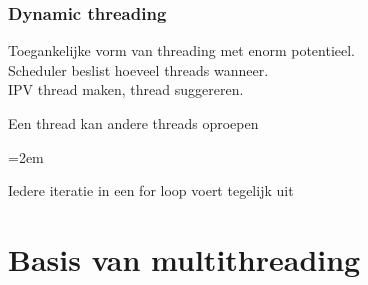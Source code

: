 \documentclass
   [kulak] %
   {kulakbeamer}
\begin{document}
\begin{frame}
	\frametitle{Dynamic threading}
	
	Toegankelijke vorm van threading met enorm potentieel.\\
	Scheduler beslist hoeveel threads wanneer.\\ IPV thread maken, thread suggereren.
	
	 
	
	\begin{description}[align=parleft]
		
		\item[\textbf{Nested parallalism}]
		
		Een thread kan andere threads oproepen
		
		\itemsep=2em
		\item[\textbf{Parallel loop}]
		
		Iedere iteratie in een for loop voert tegelijk uit
		
	\end{description}
	
	
\end{frame}

\section[Basis]{Basis van multithreading}
\end{document}
